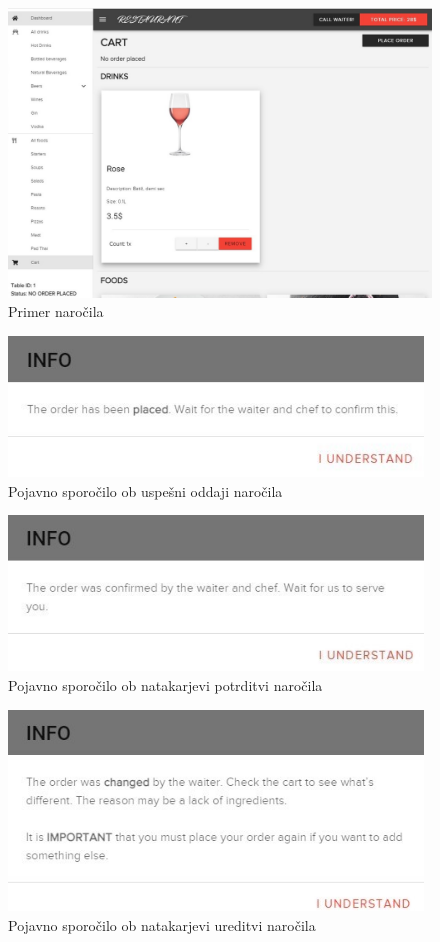 \documentclass[a4paper, 12pt]{book}
\begin{document}
\begin{figure}[!htb]
\centering
\includegraphics[width=13.7cm]{customer_2.jpg}
\caption{Primer naročila}
\label{Gost_4}
\end{figure}
\begin{figure}[!htb]
\centering
\includegraphics[width=11cm]{gost_5.jpg}
\caption{Pojavno sporočilo ob uspešni oddaji naročila}
\label{Gost_5}
\end{figure}
\begin{figure}[!htb]
\centering
\includegraphics[width=11cm]{gost_6.jpg}
\caption{Pojavno sporočilo ob natakarjevi potrditvi naročila}
\label{Gost_6}
\end{figure}
\begin{figure}[!htb]
\centering
\includegraphics[width=11cm]{gost_8.jpg}
\caption{Pojavno sporočilo ob natakarjevi ureditvi naročila}
\label{Gost_8}
\end{figure}
\end{document}
